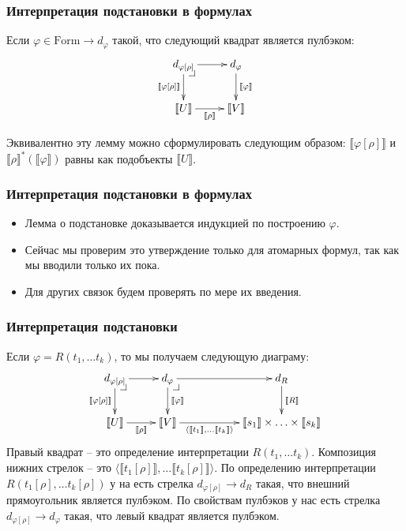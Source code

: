 \documentclass{beamer}
\makeatletter
\theoremstyle{definition}
\renewcommand{\ll}{\llbracket}
\newcommand{\rr}{\rrbracket}
\newcommand{\fs}[1]{\mathrm{#1}}
\newcommand{\pb}[1][dr]{\save*!/#1-1.2pc/#1:(-1,1)@^{|-}\restore}
\makeatother
\begin{document}
\begin{frame}
\frametitle{Интерпретация подстановки в формулах}
\begin{lem}
Если $\varphi \in \fs{Form} \to d_\varphi$ такой, что следующий квадрат является пулбэком:
\[ \xymatrix{ d_{\varphi[\rho]} \ar[r] \ar[d]_{\ll \varphi[\rho] \rr} \pb & d_\varphi \ar[d]^{\ll \varphi \rr} \\
              \ll U \rr \ar[r]_-{\ll \rho \rr}        & \ll V \rr
            } \]
\end{lem}
Эквивалентно эту лемму можно сформулировать следующим образом: $\ll \varphi[\rho] \rr$ и $\ll \rho\rr^*(\ll \varphi \rr)$ равны как подобъекты $\ll U \rr$.
\end{frame}

\begin{frame}
\frametitle{Интерпретация подстановки в формулах}
\begin{itemize}
\item Лемма о подстановке доказывается индукцией по построению $\varphi$.
\item Сейчас мы проверим это утверждение только для атомарных формул, так как мы вводили только их пока.
\item Для других связок будем проверять по мере их введения.
\end{itemize}
\end{frame}

\begin{frame}
\frametitle{Интерпретация подстановки}
Если $\varphi = R(t_1, \ldots t_k)$, то мы получаем следующую диаграму:
\[ \xymatrix{ d_{\varphi[\rho]} \ar[r] \ar[d]_{\ll \varphi[\rho] \rr} \pb & d_\varphi \ar[d]^{\ll \varphi \rr} \ar[rr] \pb                                        & & d_R \ar[d]^{\ll R \rr} \\
              \ll U \rr \ar[r]_-{\ll \rho \rr}            & \ll V \rr \ar[rr]_-{\langle \ll t_1 \rr, \ldots \ll t_k \rr \rangle} & & \ll s_1 \rr \times \ldots \times \ll s_k \rr
            } \]
Правый квадрат -- это определение интерпретации $R(t_1, \ldots t_k)$.
Композиция нижних стрелок -- это $\langle \ll t_1[\rho] \rr, \ldots \ll t_k[\rho] \rr \rangle$.
По определению интерпретации $R(t_1[\rho], \ldots t_k[\rho])$ у на есть стрелка $d_{\varphi[\rho]} \to d_R$ такая, что внешний прямоугольник является пулбэком.
По свойствам пулбэков у нас есть стрелка $d_{\varphi[\rho]} \to d_\varphi$ такая, что левый квадрат является пулбэком.
\end{frame}
\end{document}
